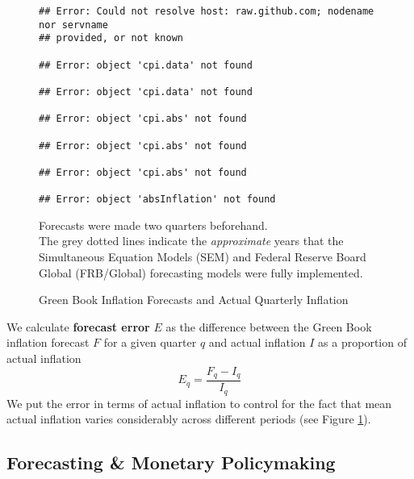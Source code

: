 \documentclass[a4paper]{article}\usepackage{graphicx, color}
\makeatletter
\newenvironment{kframe}{%
 \def\FrameCommand##1{\hskip\@totalleftmargin \hskip-\fboxsep
 \colorbox{shadecolor}{##1}\hskip-\fboxsep
     \hskip-\linewidth \hskip-\@totalleftmargin \hskip\columnwidth}%
 \MakeFramed {\advance\hsize-\width
   \@totalleftmargin\z@ \linewidth\hsize
   \@setminipage}}%
 {\par\unskip\endMakeFramed}
\newenvironment{knitrout}{}{} %
\makeatother
\begin{document}
\begin{figure}[t]
    \caption{Green Book Inflation Forecasts and Actual Quarterly Inflation}
    \label{absolute}
    \begin{center}
    
\begin{knitrout}
\color{fgcolor}\begin{kframe}
\begin{verbatim}
## Error: Could not resolve host: raw.github.com; nodename nor servname
## provided, or not known

## Error: object 'cpi.data' not found

## Error: object 'cpi.data' not found

## Error: object 'cpi.abs' not found

## Error: object 'cpi.abs' not found

## Error: object 'cpi.abs' not found

## Error: object 'absInflation' not found
\end{verbatim}
\end{kframe}
\end{knitrout}

    
    \end{center}
    \begin{singlespace}
        {\scriptsize{Forecasts were made two quarters beforehand. \\
                     The grey dotted lines indicate the {\emph{approximate}} years that the Simultaneous Equation Models (SEM) and Federal Reserve Board Global (FRB/Global) forecasting models were fully implemented.  
                      }}
    \end{singlespace}
\end{figure}

We calculate {\bf{forecast error}} $E$ as the difference between the Green Book inflation forecast $F$ for a given quarter $q$ and actual inflation $I$ as a proportion of actual inflation
%
\begin{equation}
    E_{q} = \frac{F_{q} - I_{q}}{I_{q}}
\end{equation}
%
We put the error in terms of actual inflation to control for the fact that mean actual inflation varies considerably across different periods (see Figure \ref{absolute}). 

\subsection{Forecasting \& Monetary Policymaking}
\end{document}

